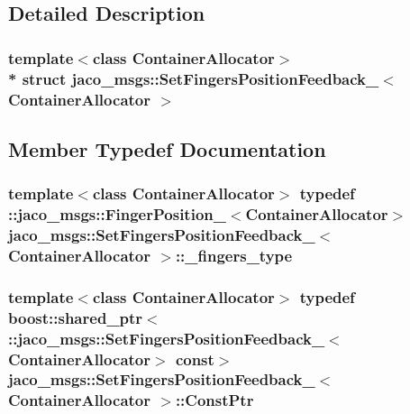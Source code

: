 \subsection{Detailed Description}
\subsubsection*{template$<$class Container\+Allocator$>$\\*
struct jaco\+\_\+msgs\+::\+Set\+Fingers\+Position\+Feedback\+\_\+$<$ Container\+Allocator $>$}



\subsection{Member Typedef Documentation}
\subsubsection[{\texorpdfstring{\+\_\+fingers\+\_\+type}{_fingers_type}}]{\setlength{\rightskip}{0pt plus 5cm}template$<$class Container\+Allocator$>$ typedef \+::{\bf jaco\+\_\+msgs\+::\+Finger\+Position\+\_\+}$<$Container\+Allocator$>$ {\bf jaco\+\_\+msgs\+::\+Set\+Fingers\+Position\+Feedback\+\_\+}$<$ Container\+Allocator $>$\+::{\bf \+\_\+fingers\+\_\+type}}\hypertarget{structjaco__msgs_1_1SetFingersPositionFeedback___a462f832c5d1b5423986e6c7b2e4020d9}{}\label{structjaco__msgs_1_1SetFingersPositionFeedback___a462f832c5d1b5423986e6c7b2e4020d9}
\subsubsection[{\texorpdfstring{Const\+Ptr}{ConstPtr}}]{\setlength{\rightskip}{0pt plus 5cm}template$<$class Container\+Allocator$>$ typedef boost\+::shared\+\_\+ptr$<$ \+::{\bf jaco\+\_\+msgs\+::\+Set\+Fingers\+Position\+Feedback\+\_\+}$<$Container\+Allocator$>$ const$>$ {\bf jaco\+\_\+msgs\+::\+Set\+Fingers\+Position\+Feedback\+\_\+}$<$ Container\+Allocator $>$\+::{\bf Const\+Ptr}}\hypertarget{structjaco__msgs_1_1SetFingersPositionFeedback___a1039354c9981f48a820d5676ecda8d7c}{}\label{structjaco__msgs_1_1SetFingersPositionFeedback___a1039354c9981f48a820d5676ecda8d7c}
